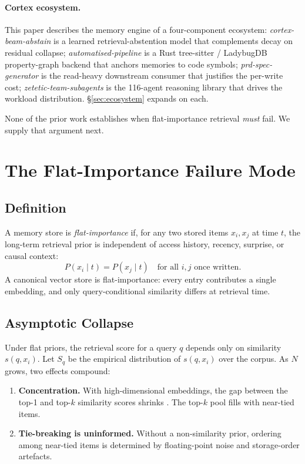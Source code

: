 \documentclass[11pt]{article}
\begin{document}
\paragraph{Cortex ecosystem.}
This paper describes the memory engine of a four-component
ecosystem: \emph{cortex-beam-abstain} \citep{Deust2026a} is a
learned retrieval-abstention model that complements decay on
residual collapse; \emph{automatised-pipeline} \citep{Deust2026b} is
a Rust tree-sitter / LadybugDB property-graph backend that anchors
memories to code symbols; \emph{prd-spec-generator}
\citep{Deust2026c} is the read-heavy downstream consumer that
justifies the per-write cost; \emph{zetetic-team-subagents}
\citep{Deust2026d} is the 116-agent reasoning library that drives
the workload distribution.  \S\ref{sec:ecosystem} expands on each.

None of the prior work establishes when flat-importance retrieval
\emph{must} fail.  We supply that argument next.

\section{The Flat-Importance Failure Mode}
\label{sec:flat-failure}

\subsection{Definition}
\label{sec:flat-def}

A memory store is \emph{flat-importance} if, for any two stored
items $x_i, x_j$ at time $t$, the long-term retrieval prior is
independent of access history, recency, surprise, or causal context:
\begin{equation}
P(x_i \mid t) = P(x_j \mid t) \quad \text{for all } i, j \text{ once written.}
\label{eq:flat-prior}
\end{equation}
A canonical vector store is flat-importance: every entry contributes
a single embedding, and only query-conditional similarity differs
at retrieval time.

\subsection{Asymptotic Collapse}
\label{sec:flat-collapse}

Under flat priors, the retrieval score for a query $q$ depends only
on similarity $s(q, x_i)$.  Let $S_q$ be the empirical distribution
of $s(q, x_i)$ over the corpus.  As $N$ grows, two effects compound:
\begin{enumerate}
  \item \textbf{Concentration.}  With high-dimensional embeddings,
        the gap between the top-1 and top-$k$ similarity scores
        shrinks \citep{Aggarwal2001,Beyer1999}.  The top-$k$ pool
        fills with near-tied items.
  \item \textbf{Tie-breaking is uninformed.}  Without a
        non-similarity prior, ordering among near-tied items is
        determined by floating-point noise and storage-order
        artefacts.
\end{enumerate}
\end{document}
